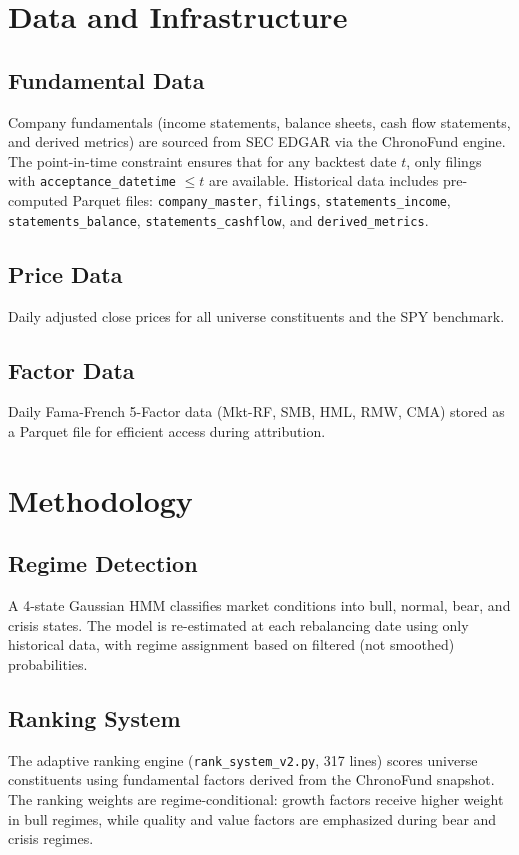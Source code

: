 \documentclass[11pt]{article}
\begin{document}
\section{Data and Infrastructure}

\subsection{Fundamental Data}
Company fundamentals (income statements, balance sheets, cash flow statements, and derived metrics) are sourced from SEC EDGAR via the ChronoFund engine. The point-in-time constraint ensures that for any backtest date $t$, only filings with \texttt{acceptance\_datetime} $\leq t$ are available. Historical data includes pre-computed Parquet files: \texttt{company\_master}, \texttt{filings}, \texttt{statements\_income}, \texttt{statements\_balance}, \texttt{statements\_cashflow}, and \texttt{derived\_metrics}.

\subsection{Price Data}
Daily adjusted close prices for all universe constituents and the SPY benchmark.

\subsection{Factor Data}
Daily Fama-French 5-Factor data (Mkt-RF, SMB, HML, RMW, CMA) stored as a Parquet file for efficient access during attribution.

\section{Methodology}

\subsection{Regime Detection}
A 4-state Gaussian HMM classifies market conditions into bull, normal, bear, and crisis states. The model is re-estimated at each rebalancing date using only historical data, with regime assignment based on filtered (not smoothed) probabilities.

\subsection{Ranking System}
The adaptive ranking engine (\texttt{rank\_system\_v2.py}, 317 lines) scores universe constituents using fundamental factors derived from the ChronoFund snapshot. The ranking weights are regime-conditional: growth factors receive higher weight in bull regimes, while quality and value factors are emphasized during bear and crisis regimes.
\end{document}
